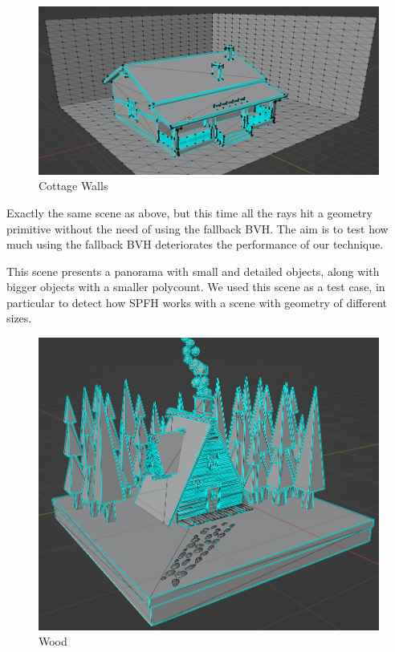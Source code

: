 \documentclass{PoliMi_MasterThesis}
\begin{document}
\begin{minipage}{0.4\textwidth}
	\begin{figure}[H]
		\includegraphics[width=\textwidth]{Images/cottage_walls_scene.png}
		\caption{Cottage Walls}
		\label{fig:cottage_walls}
	\end{figure}
\end{minipage} \hfill
\begin{minipage}{0.55\textwidth}
	Exactly the same scene as above, but this time all the rays hit a geometry primitive without the need of using the fallback BVH. The aim is to test how much using the fallback BVH deteriorates the performance of our technique.
\end{minipage}

\begin{minipage}{0.55\textwidth}
	This scene presents a panorama with small and detailed objects, along with bigger objects with a smaller polycount. We used this scene as a test case, in particular to detect how SPFH works with a scene with geometry of different sizes.
\end{minipage}
\hfill \begin{minipage}{0.4\textwidth}
	\begin{figure}[H]
		\includegraphics[width=\textwidth]{Images/wood_scene.png}
		\caption{Wood}
		\label{fig:Wood}
	\end{figure}
\end{minipage} 
\end{document}
